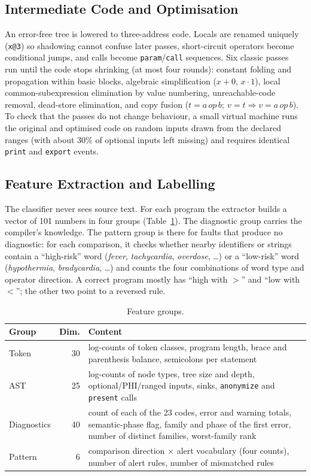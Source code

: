 \documentclass[12pt,a4paper]{article}
\newcommand{\code}[1]{\texttt{#1}}
\newcommand{\NFeat}{101}
\begin{document}
\subsection{Intermediate Code and Optimisation}

An error-free tree is lowered to three-address code. Locals are renamed uniquely (\code{x@3}) so shadowing cannot
confuse later passes, short-circuit operators become conditional jumps, and calls become \code{param}/\code{call}
sequences. Six classic passes~\cite{muchnick1997,aho2006} run until the code stops shrinking (at most four rounds):
constant folding and propagation within basic blocks, algebraic simplification ($x+0$, $x\cdot 1$), local
common-subexpression elimination by value numbering, unreachable-code removal, dead-store elimination, and copy fusion
($t=a\,\mathit{op}\,b;\ v=t \Rightarrow v=a\,\mathit{op}\,b$). To check that the passes do not change behaviour, a small
virtual machine runs the original and optimised code on random inputs drawn from the declared ranges (with about 30\% of
optional inputs left missing) and requires identical \code{print} and \code{export} events.

\subsection{Feature Extraction and Labelling}

The classifier never sees source text. For each program the extractor builds a vector of \NFeat{} numbers in four
groups (Table~\ref{tab:features}). The diagnostic group carries the compiler's knowledge. The pattern group is there for
faults that produce no diagnostic: for each comparison, it checks whether nearby identifiers or strings contain a
``high-risk'' word (\emph{fever}, \emph{tachycardia}, \emph{overdose}, \ldots) or a ``low-risk'' word
(\emph{hypothermia}, \emph{bradycardia}, \ldots) and counts the four combinations of word type and operator direction. A
correct program mostly has ``high with $>$'' and ``low with $<$''; the other two point to a reversed rule.

\begin{table}[!htbp]
\centering
\caption{Feature groups.}
\label{tab:features}
\small
\begin{tabular}{lrp{10.2cm}}
\toprule
\textbf{Group} & \textbf{Dim.} & \textbf{Content}\\
\midrule
Token & 30 & log-counts of token classes, program length, brace and parenthesis balance, semicolons per statement\\
AST & 25 & log-counts of node types, tree size and depth, optional/PHI/ranged inputs, sinks, \code{anonymize} and \code{present} calls\\
Diagnostics & 40 & count of each of the 23 codes, error and warning totals, semantic-phase flag, family and phase of the first error, number of distinct families, worst-family rank\\
Pattern & 6 & comparison direction $\times$ alert vocabulary (four counts), number of alert rules, number of mismatched rules\\
\bottomrule
\end{tabular}
\end{table}
\end{document}
